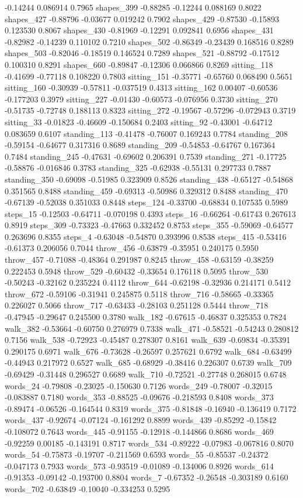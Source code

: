 \documentclass[10pt, letterpaper]{article}
\begin{document}
-0.14244 0.086914 0.7965 shapes\_399 -0.88285 -0.12244 0.088169 0.8022
shapes\_427 -0.88796 -0.03677 0.019242 0.7902 shapes\_429 -0.87530
-0.15893 0.123530 0.8067 shapes\_430 -0.81969 -0.12291 0.092841 0.6956
shapes\_431 -0.82982 -0.14239 0.110102 0.7210 shapes\_502 -0.86349
-0.23439 0.168516 0.8289 shapes\_503 -0.82046 -0.18519 0.146524 0.7289
shapes\_521 -0.88792 -0.17512 0.100310 0.8291 shapes\_660 -0.89847
-0.12306 0.066866 0.8269 sitting\_118 -0.41699 -0.77118 0.108220 0.7803
sitting\_151 -0.35771 -0.65760 0.068490 0.5651 sitting\_160 -0.30939
-0.57811 -0.037519 0.4313 sitting\_162 0.00407 -0.60536 -0.177203 0.3979
sitting\_227 -0.01430 -0.60573 -0.076956 0.3730 sitting\_270 -0.51735
-0.72748 0.188113 0.8323 sitting\_272 -0.19567 -0.57296 -0.072943 0.3719
sitting\_33 -0.01823 -0.46609 -0.150684 0.2403 sitting\_92 -0.43001
-0.64712 0.083659 0.6107 standing\_113 -0.41478 -0.76007 0.169243 0.7784
standing\_208 -0.59154 -0.64677 0.317316 0.8689 standing\_209 -0.54853
-0.64767 0.167364 0.7484 standing\_245 -0.47631 -0.69602 0.206391 0.7539
standing\_271 -0.17725 -0.58876 -0.016846 0.3783 standing\_325 -0.62938
-0.55131 0.297733 0.7887 standing\_350 -0.69098 -0.51985 0.323909 0.8526
standing\_438 -0.65127 -0.54868 0.351565 0.8488 standing\_459 -0.69313
-0.50986 0.329312 0.8488 standing\_470 -0.67139 -0.52038 0.351033 0.8448
steps\_124 -0.33700 -0.68834 0.107535 0.5989 steps\_15 -0.12503 -0.64711
-0.070198 0.4393 steps\_16 -0.66264 -0.61743 0.267613 0.8919 steps\_309
-0.73323 -0.47663 0.332452 0.8753 steps\_355 -0.59069 -0.64577 0.263696
0.8355 steps\_4 -0.63048 -0.54870 0.393996 0.8538 steps\_415 -0.53416
-0.61373 0.206056 0.7044 throw\_456 -0.63879 -0.35951 0.240175 0.5950
throw\_457 -0.71088 -0.48364 0.291987 0.8245 throw\_458 -0.63159
-0.38259 0.222453 0.5948 throw\_529 -0.60432 -0.33654 0.176118 0.5095
throw\_530 -0.50243 -0.32162 0.235224 0.4112 throw\_644 -0.62198
-0.32936 0.214171 0.5412 throw\_672 -0.59106 -0.31941 0.245875 0.5118
throw\_716 -0.58665 -0.33365 0.226027 0.5066 throw\_717 -0.63433
-0.28103 0.251128 0.5444 throw\_718 -0.47945 -0.29647 0.245500 0.3780
walk\_182 -0.67615 -0.46837 0.325353 0.7824 walk\_382 -0.53664 -0.60750
0.276979 0.7338 walk\_471 -0.58521 -0.54243 0.280812 0.7156 walk\_538
-0.72923 -0.45487 0.278307 0.8161 walk\_639 -0.69834 -0.35391 0.290175
0.6971 walk\_676 -0.73628 -0.26597 0.257621 0.6792 walk\_684 -0.63499
-0.44943 0.217972 0.6527 walk\_685 -0.68929 -0.38416 0.226307 0.6739
walk\_709 -0.69429 -0.31448 0.296527 0.6689 walk\_710 -0.72521 -0.27748
0.268015 0.6748 words\_24 -0.79808 -0.23025 -0.150630 0.7126 words\_249
-0.78007 -0.32015 -0.083887 0.7180 words\_353 -0.88525 -0.09676
-0.218593 0.8408 words\_373 -0.89474 -0.06526 -0.164544 0.8319
words\_375 -0.81848 -0.16940 -0.136419 0.7172 words\_437 -0.92674
-0.07124 -0.161292 0.8899 words\_439 -0.85292 -0.15842 -0.108072 0.7643
words\_445 -0.91155 -0.12918 -0.144866 0.8686 words\_469 -0.92259
0.00185 -0.143191 0.8717 words\_534 -0.89222 -0.07983 -0.067816 0.8070
words\_54 -0.75873 -0.19707 -0.211569 0.6593 words\_55 -0.85537 -0.24372
-0.047173 0.7933 words\_573 -0.93519 -0.01089 -0.134006 0.8926
words\_614 -0.91353 -0.09142 -0.193700 0.8804 words\_7 -0.67352 -0.26548
-0.303189 0.6160 words\_702 -0.63849 -0.10040 -0.334253 0.5295
\end{document}
